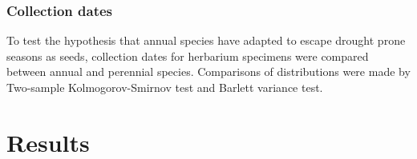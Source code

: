 \documentclass[man,floatsintext]{apa6}
\theoremstyle{definition}
\theoremstyle{definition}
\theoremstyle{definition}
\theoremstyle{remark}
\begin{document}
\hypertarget{collection-dates}{%
\subsubsection{Collection dates}\label{collection-dates}}

To test the hypothesis that annual species have adapted to escape
drought prone seasons as seeds, collection dates for herbarium specimens
were compared between annual and perennial species. Comparisons of
distributions were made by Two-sample Kolmogorov-Smirnov test and
Barlett variance test.

\hypertarget{results}{%
\section{Results}\label{results}}
\end{document}
